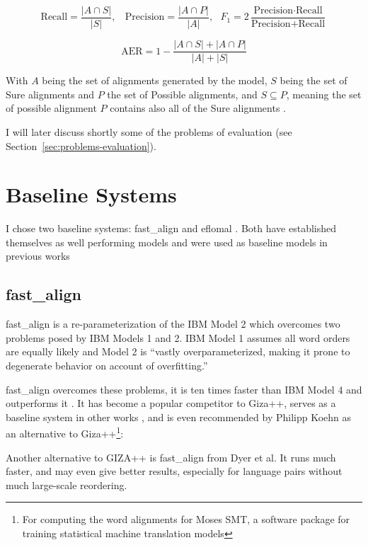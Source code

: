 \[
	\text{Recall} = \frac{|A\cap S|}{|S|},~~~~\text{Precision}  = \frac{|A\cap P|}{|A|},~~~F_1 = 2\frac{\text{Precision}\cdot\text{Recall}}{\text{Precision}+\text{Recall}}
\]

\[
	\text{AER} = 1- \frac{|A\cap S|+|A\cap P|}{|A|+|S|}
\]

With $A$ being the set of alignments generated by the model, $S$ being the set of Sure alignments and $P$ the set of Possible alignments, and $S \subseteq P$, meaning the set of possible alignment $P$ contains also all of the Sure alignments \autocite{och-ney-2000-improved}.

I will later discuss shortly some of the problems of evaluation (see Section~\ref{sec:problems-evaluation}).


\section{Baseline Systems}
I chose two baseline systems: fast\_align \autocite{dyer-etal-2013-simple} and eflomal \autocite{Ostling2016efmaral}. 
Both have established themselves as well performing models and were used as baseline models in previous works \autocites{Ostling2016efmaral,jalili-sabet-etal-2020-simalign,steingrimsson-etal-2021-combalign}

\subsection{fast\_align}
fast\_align is a re-parameterization of the IBM Model 2 which overcomes two problems posed by IBM Models 1 and 2. 
IBM Model 1 assumes all word orders are equally likely and Model 2 is \enquote{vastly overparameterized, making it prone to degenerate behavior on account of overfitting.} \autocite{dyer-etal-2013-simple} 

fast\_align overcomes these problems, it is ten times faster than IBM Model 4 and outperforms it \autocite{dyer-etal-2013-simple}.
It has become a popular competitor to Giza++, serves as a baseline system in other works \autocites{Ostling2016efmaral,jalili-sabet-etal-2020-simalign}, and is even recommended by Philipp Koehn as an alternative to Giza++\footnote{For computing the word alignments for Moses SMT, a software package for training statistical machine translation models}:



\begin{displayquote}
Another alternative to GIZA++ is fast\_align from Dyer et al. It runs much faster, and may even give better results, especially for language pairs without much large-scale reordering. \autocite[115]{koehn-moses-smt-2022}
\end{displayquote}
 

